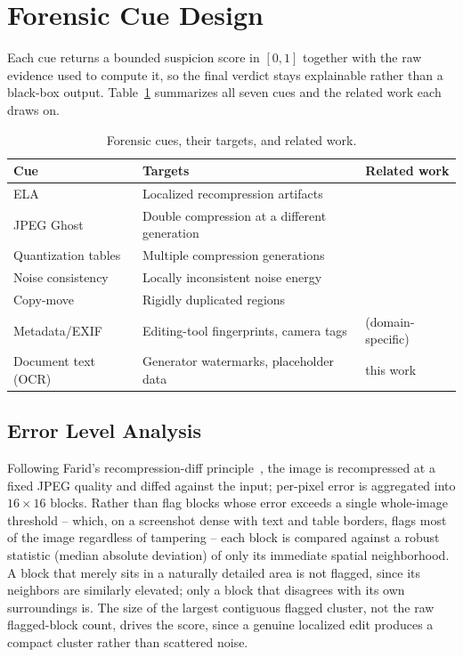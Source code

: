 \documentclass[conference]{IEEEtran}
\begin{document}
\section{Forensic Cue Design}
\label{sec:cues}

Each cue returns a bounded suspicion score in $[0,1]$ together with the raw
evidence used to compute it, so the final verdict stays explainable rather
than a black-box output. Table~\ref{tab:cues} summarizes all seven cues and
the related work each draws on.

\begin{table}[t]
\centering
\caption{Forensic cues, their targets, and related work.}
\label{tab:cues}
\small
\begin{tabular}{@{}p{1.7cm}p{3.6cm}p{2.2cm}@{}}
\toprule
\textbf{Cue} & \textbf{Targets} & \textbf{Related work} \\
\midrule
ELA & Localized recompression artifacts & \cite{farid2009ghosts,bianchi2012block,bianchi2012nonaligned} \\
JPEG Ghost & Double compression at a different generation & \cite{farid2009ghosts,lin2009fast} \\
Quantization tables & Multiple compression generations & \cite{bianchi2012block,bianchi2012nonaligned} \\
Noise consistency & Locally inconsistent noise energy & \cite{lukas2006digital,lyu2014exposing} \\
Copy-move & Rigidly duplicated regions & \cite{fridrich2003copymove,popescu2004exposing,huang2008sift,christlein2012evaluation} \\
Metadata/EXIF & Editing-tool fingerprints, camera tags & (domain-specific) \\
Document text (OCR) & Generator watermarks, placeholder data & this work \\
\bottomrule
\end{tabular}
\end{table}

\subsection{Error Level Analysis}
Following Farid's recompression-diff principle~\cite{farid2009ghosts}, the
image is recompressed at a fixed JPEG quality and diffed against the input;
per-pixel error is aggregated into $16\times16$ blocks. Rather than flag
blocks whose error exceeds a single whole-image threshold -- which, on a
screenshot dense with text and table borders, flags most of the image
regardless of tampering -- each block is compared against a robust statistic
(median absolute deviation) of only its immediate spatial neighborhood. A
block that merely sits in a naturally detailed area is not flagged, since its
neighbors are similarly elevated; only a block that disagrees with its own
surroundings is. The size of the largest contiguous flagged cluster, not the
raw flagged-block count, drives the score, since a genuine localized edit
produces a compact cluster rather than scattered noise.
\end{document}
